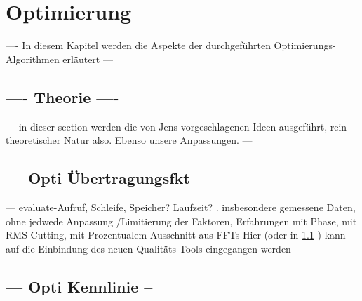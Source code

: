 \documentclass[../Report.tex]{subfiles}
\begin{document}
\chapter{Optimierung}
\label{chap:opt}
---- In diesem Kapitel werden die Aspekte der durchgeführten Optimierungs-Algorithmen erläutert --- 

\section{---- Theorie ----}
\label{sec:opt.theo}
--- in dieser section werden die von Jens vorgeschlagenen Ideen ausgeführt, rein theoretischer Natur also. Ebenso unsere Anpassungen.  ---

\section{ --- Opti Übertragungsfkt --}
\label{sec:opt.H}
--- evaluate-Aufruf, Schleife, Speicher? Laufzeit? . insbesondere gemessene Daten, ohne jedwede Anpassung /Limitierung der Faktoren, Erfahrungen mit Phase, mit RMS-Cutting, mit Prozentualem Ausschnitt aus FFTs Hier (oder in \ref{sec:opt.theo} ) kann auf die Einbindung des neuen Qualitäts-Tools eingegangen werden --- 

\section{--- Opti Kennlinie --}
\label{sec:opt.K}
\end{document}
